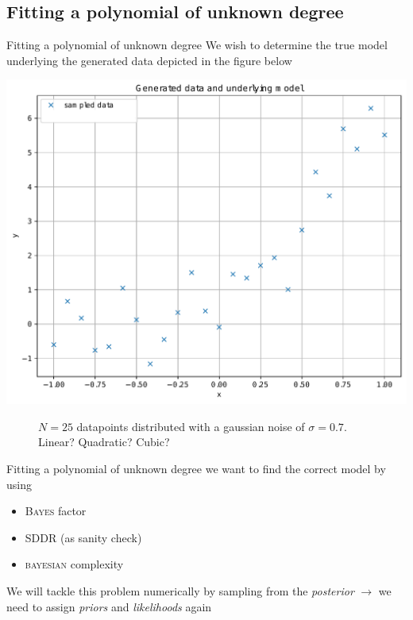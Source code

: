 \documentclass[11pt,aspectratio=1610,dvipsnames]{beamer}
\begin{document}
\subsection{Fitting a polynomial of unknown degree}
\begin{frame}{Fitting a polynomial of unknown degree}
	We wish to determine the true model underlying the generated data depicted in the figure below

		\centering
		\begin{minipage}{.7\linewidth}
			\includegraphics[width=.9\linewidth]{data_regression_line_sigma_07a_data.pdf}
		\end{minipage}
		\begin{minipage}{.25\linewidth}
				\begin{figure}
						\vspace{4.5cm}
						\caption{$N=25$ datapoints distributed with a gaussian noise of $\sigma=0.7$. Linear? Quadratic? Cubic?}
				\end{figure}

		\end{minipage}

	
	
\end{frame}

\begin{frame}{Fitting a polynomial of unknown degree}
	we want to find the correct model by using
	
	\begin{itemize}
		\item \textsc{Bayes} factor 
		\item SDDR (as sanity check)
		\item \textsc{bayesian} complexity
	\end{itemize}
	We will tackle this problem numerically by sampling from the \emph{posterior} $\to$ we need to assign \emph{priors} and \emph{likelihoods} again
\end{frame}
\end{document}
